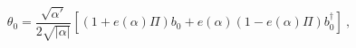 \begin{equation}
\theta_{0}= \frac{\sqrt{\alpha'}}{2 \sqrt{|\alpha|}}
\left[ (1 + e(\alpha) \Pi ) b_0 + 
e(\alpha) (1 - e(\alpha) \Pi) b_{0}^{\dagger} \right]~,
\label{th0sv}
\end{equation}

